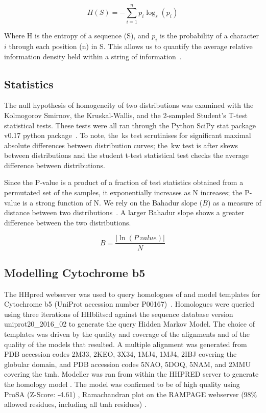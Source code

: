 \begin{equation} \label{simpleentropy2}
	H(S)=-{\sum_{i=1}^n {p_i\log_s(p_i)}}
\end{equation}

Where H is the entropy of a sequence (S), and $p_i$ is the probability of a character $i$ through each position (n) in S. This allows us to quantify the average relative information density held within a string of information~\cite{Shannon1948}.

\subsection{Statistics}

The null hypothesis of homogeneity of two distributions was examined with the Kolmogorov Smirnov, the Kruskal-Wallis, and the 2-sampled Student's T-test statistical tests.
These tests were all ran through the Python SciPy stat package v0.17 python package~\cite{VanderWalt2011}.
To note, the~\gls{ks} test scrutinises for significant maximal absolute differences between distribution curves; the~\gls{kw} test is after skews between distributions and the student t-test statistical test checks the average difference between distributions.

Since the P‑value is a product of a fraction of test statistics obtained from a permutated set of the samples, it exponentially increases as N increases; the P-value is a strong function of N.
We rely on the Bahadur slope ($B$) as a measure of distance between two distributions~\cite{Bahadur1967, Bahadur1971, Sunyaev1998, Baker2017}. A larger Bahadur slope shows a greater difference between the two distributions.

\begin{equation} \label{eq:bahadur2}
B=\frac{|\ln(P~value)|}{N}
\end{equation}

\subsection{Modelling Cytochrome b5}
The HHpred webserver was used to query homologues of and model templates for Cytochrome b5 (UniProt accession number P00167)~\cite{Soding 2005, Soding 2005a}.
Homologues were queried using three iterations of HHblitscd against the sequence database version uniprot20\_2016\_02 to generate the query Hidden Markov Model.
The choice of templates was driven by the quality and coverage of the alignments and of the quality of the models that resulted.
A multiple alignment was generated from PDB accession codes 2M33, 2KEO, 3X34, 1MJ4, 1MJ4, 2IBJ covering the globular domain, and PDB accession codes 5NAO, 5DOQ, 5NAM, and 2MMU covering the \gls{tmh}.
Modeller was ran from within the HHPRED server to generate the homology model \cite{Eswar2007,Zimmerman2017,Webb2016}.
The model was confirmed to be of high quality using ProSA (Z-Score: -4.61) \cite{Wiederstein2007}, Ramachandran plot on the RAMPAGE webserver (98\% allowed residues, including all \gls{tmh} residues) \cite{Lovell2003}.

